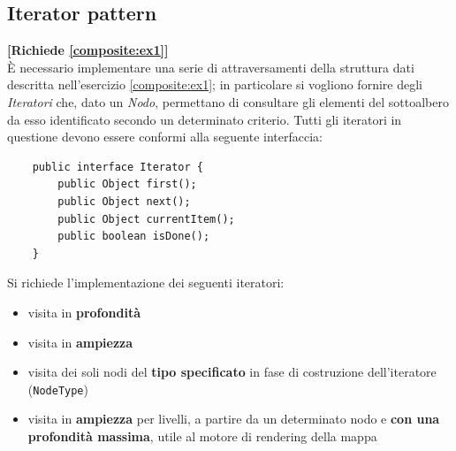 \documentclass[12pt,a4paper]{article}
\begin{document}
    \subsection{Iterator pattern}
    \begin{Exercise}
    \small\textbf{[Richiede \hyperlink{composite:ex1}{\ref{composite:ex1}}]} \\
        È necessario implementare una serie di attraversamenti della struttura dati descritta nell'esercizio \hyperlink{composite:ex1}{\ref{composite:ex1}}; in particolare si vogliono fornire degli \textit{Iteratori} che, dato un \textit{Nodo}, permettano di consultare gli elementi del sottoalbero da esso identificato secondo un determinato criterio.
        Tutti gli iteratori in questione devono essere conformi alla seguente interfaccia:
        \begin{lstlisting}
    public interface Iterator {
        public Object first();
        public Object next();
        public Object currentItem();
        public boolean isDone();
    }
        \end{lstlisting}
        Si richiede l'implementazione dei seguenti iteratori:
        \begin{itemize}
            \item visita in \textbf{profondità}
            \item visita in \textbf{ampiezza}
            \item visita dei soli nodi del \textbf{tipo specificato} in fase di costruzione dell'iteratore (\texttt{NodeType})
            \item visita in \textbf{ampiezza} per livelli, a partire da un determinato nodo e \textbf{con una profondità massima}, utile al motore di rendering della mappa
        \end{itemize}
    
    \end{Exercise}

\end{document}
